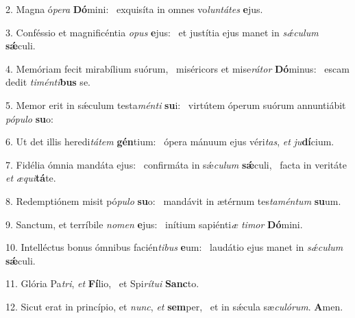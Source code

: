 2. Magna ó\textit{pe}\textit{ra} \textbf{Dó}mini: \ast\  exquisíta in omnes vo\textit{lun}\textit{tá}\textit{tes} \textbf{e}jus.\

3. Conféssio et magnificéntia \textit{o}\textit{pus} \textbf{e}jus: \ast\  et justítia ejus manet in \textit{sǽ}\textit{cu}\textit{lum} \textbf{sǽ}culi.\

4. Memóriam fecit mirabílium suórum, \dag\  miséricors et mise\textit{rá}\textit{tor} \textbf{Dó}minus: \ast\  escam dedit \textit{ti}\textit{mén}\textit{ti}\textbf{bus} se.\

5. Memor erit in sǽculum testa\textit{mén}\textit{ti} \textbf{su}i: \ast\  virtútem óperum suórum annuntiábit \textit{pó}\textit{pu}\textit{lo} \textbf{su}o:\

6. Ut det illis heredi\textit{tá}\textit{tem} \textbf{gén}tium: \ast\  ópera mánuum ejus véri\textit{tas}, \textit{et} \textit{ju}\textbf{dí}cium.\

7. Fidélia ómnia mandáta ejus: \dag\  confirmáta in sǽ\textit{cu}\textit{lum} \textbf{sǽ}culi, \ast\  facta in veritáte \textit{et} \textit{æ}\textit{qui}\textbf{tá}te.\

8. Redemptiónem misit pó\textit{pu}\textit{lo} \textbf{su}o: \ast\  mandávit in ætérnum tes\textit{ta}\textit{mén}\textit{tum} \textbf{su}um.\

9. Sanctum, et terríbile \textit{no}\textit{men} \textbf{e}jus: \ast\  inítium sapiénti\textit{æ} \textit{ti}\textit{mor} \textbf{Dó}mini.\

10. Intelléctus bonus ómnibus facién\textit{ti}\textit{bus} \textbf{e}um: \ast\  laudátio ejus manet in \textit{sǽ}\textit{cu}\textit{lum} \textbf{sǽ}culi.\

11. Glória Pa\textit{tri}, \textit{et} \textbf{Fí}lio, \ast\  et Spi\textit{rí}\textit{tu}\textit{i} \textbf{Sanc}to.\

12. Sicut erat in princípio, et \textit{nunc}, \textit{et} \textbf{sem}per, \ast\  et in sǽcula sæ\textit{cu}\textit{ló}\textit{rum}. \textbf{A}men.\

